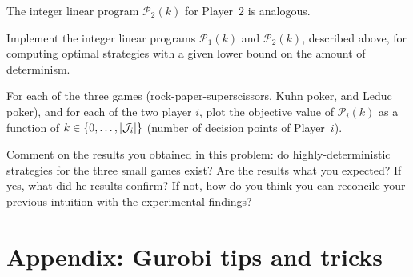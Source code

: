 \documentclass{homework}
\begin{document}
The integer linear program $\mathcal{P}_2(k)$ for Player~$2$ is analogous.

\begin{problem}[20 points]
    Implement the integer linear programs $\mathcal{P}_1(k)$ and $\mathcal{P}_2(k)$, described above, for computing optimal strategies with a given lower bound on the amount of determinism. 

    For each of the three games (rock-paper-superscissors, Kuhn poker, and Leduc poker), and for each of the two player $i$, plot the objective value of $\mathcal{P}_i(k)$ as a function of $k \in \{0, \dots, |\mathcal{J}_i|\}$ (number of decision points of Player~$i$).
\end{problem}
\begin{solution}
\end{solution}

\begin{problem}[10 points]
    Comment on the results you obtained in this problem: do highly-deterministic strategies for the three small games exist? Are the results what you expected? If yes, what did he results confirm? If not, how do you think you can reconcile your previous intuition with the experimental findings?
\end{problem}
\begin{solution}
\end{solution}

\appendix
\section{Appendix: Gurobi tips and tricks}
\end{document}
